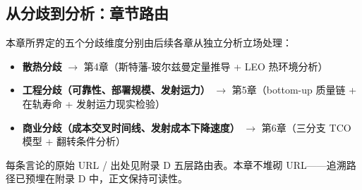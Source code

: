 \subsection{从分歧到分析：章节路由}

本章所界定的五个分歧维度分别由后续各章从独立分析立场处理：

\begin{itemize}[leftmargin=*]
    \item \textbf{散热分歧} $\to$ 第4章（斯特藩-玻尔兹曼定量推导 + LEO 热环境分析）
    \item \textbf{工程分歧（可靠性、部署规模、发射运力）} $\to$ 第5章（bottom-up 质量链 + 在轨寿命 + 发射运力现实检验）
    \item \textbf{商业分歧（成本交叉时间线、发射成本下降速度）} $\to$ 第6章（三分支 TCO 模型 + 翻转条件分析）
\end{itemize}

每条言论的原始 URL / 出处见附录 D 五层路由表。本章不堆砌 URL——追溯路径已预埋在附录 D 中，正文保持可读性。

\endinput
